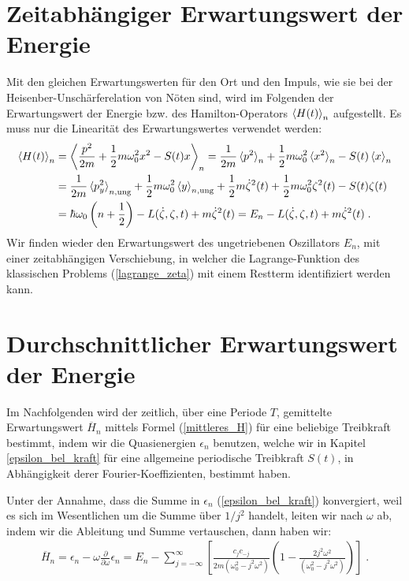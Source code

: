   \section{Zeitabhängiger Erwartungswert der Energie}
    Mit den gleichen Erwartungswerten für den Ort und den Impuls, wie sie bei der Heisenber-Unschärferelation von Nöten sind, wird im Folgenden der Erwartungswert der Energie bzw. des Hamilton-Operators $\braket{H(t)}_n$ aufgestellt.
    Es muss nur die Linearität des Erwartungswertes verwendet werden:
    \begin{align}
      \braket{H(t)}_n &= \Braket{\frac{p^2}{2m} + \frac{1}{2}m\omega_0^2x^2 - S(t)x}_n
      =\frac{1}{2m}\braket{p^2}_n + \frac{1}{2}m\omega_0^2\braket{x^2}_n - S(t)\braket{x}_n \notag\\
      &= \frac{1}{2m}\braket{p^2_y}_{n,\text{ung}} + \frac{1}{2}m\omega_0^2\braket{y}_{n,\text{ung}} + \frac{1}{2}m\dot{\zeta}^2(t) + \frac{1}{2}m\omega_0^2\zeta^2(t) - S(t)\zeta(t) \notag\\
      &= \hbar\omega_0\left(n+\frac{1}{2}\right) - L(\dot{\zeta},\zeta,t) + m\dot{\zeta}^2(t) = E_n - L(\dot{\zeta},\zeta,t) + m\dot{\zeta}^2(t) \; .
    \end{align}
    Wir finden wieder den Erwartungswert des ungetriebenen Oszillators $E_n$, mit einer zeitabhängigen Verschiebung, in welcher die Lagrange-Funktion des klassischen Problems (\ref{lagrange_zeta}) mit einem Restterm identifiziert werden kann.

  \section{Durchschnittlicher Erwartungswert der Energie}
    Im Nachfolgenden wird der zeitlich, über eine Periode $T$, gemittelte Erwartungswert $\overline{H}_n$ mittels Formel (\ref{mittleres_H}) für eine beliebige Treibkraft bestimmt, indem wir die Quasienergien $\epsilon_n$ benutzen, welche wir in Kapitel \ref{epsilon_bel_kraft} für eine allgemeine periodische Treibkraft $S(t)$, in Abhängigkeit derer Fourier-Koeffizienten, bestimmt haben.

    Unter der Annahme, dass die Summe in $\epsilon_n$ (\ref{epsilon_bel_kraft}) konvergiert, weil es sich im Wesentlichen um die Summe über $1/j^2$ handelt, leiten wir nach $\omega$ ab, indem wir die Ableitung und Summe vertauschen, dann haben wir:
    \begin{align}
      \overline{H}_n = \epsilon_n - \omega\frac{\partial}{\partial \omega}\epsilon_n
      = E_n - \sum_{j=-\infty}^{\infty} \left[ \frac{c_jc_{-j}}{2m(\omega_0^2-j^2\omega^2)}\left( 1-\frac{2j^2\omega^2}{(\omega_0^2-j^2\omega^2)}\right) \right] \; .
    \end{align}

